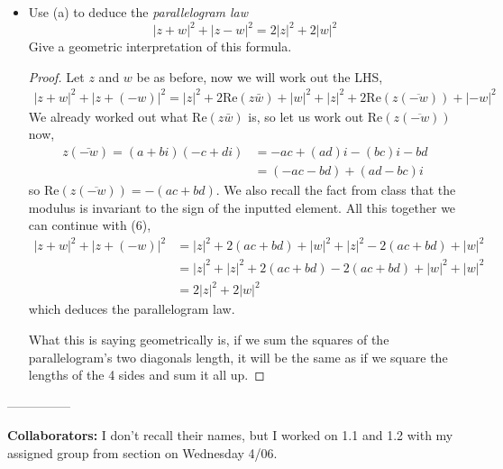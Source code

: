 \documentclass[11pt]{article}
\newenvironment{problem}[2][Problem\!]{\begin{trivlist}
\item[\hskip \labelsep {\bfseries #1}\hskip \labelsep {\bfseries #2.}]}{\end{trivlist}}
\newcommand{\abs}[1]{\left\lvert#1\right\rvert} %
\begin{document}
\begin{problem}{1.3}
\begin{itemize}[itemsep=3em]
\item[(b)] Use (a) to deduce the \emph{parallelogram law}
\[\abs{z+w}^2 + \abs{z-w}^2 = 2\abs{z}^2 + 2\abs{w}^2\]
Give a geometric interpretation of this formula. 
\begin{example}
    \begin{proof}
        Let $z$ and $w$ be as before, now we will work out the LHS,
        \begin{align}
            \abs{z + w}^{2} + \abs{z + (-w)}^{2} = \abs{z}^{2} + 2\text{Re}(z\bar{w}) + \abs{w}^{2} + \abs{z}^{2} + 2\text{Re}(z(\overline{-w})) + \abs{-w}^{2}
        \end{align}
        We already worked out what Re$(z\bar{w})$ is, so let us work out Re$(z(\overline{-w}))$ now,
        \begin{align*}
            z(\bar{-w}) = (a+bi)(-c+di) &= -ac + (ad)i -(bc)i -bd \\
            &= (-ac -bd) + (ad -bc)i
        \end{align*}
        so Re$(z(\overline{-w})) = -(ac+bd)$. We also recall the fact from class that the modulus is invariant to the sign of the inputted element. All this together we can continue with (6),
        \begin{align*}
            \abs{z + w}^{2} + \abs{z + (-w)}^{2} &= \abs{z}^{2} + 2(ac + bd) + \abs{w}^{2} + \abs{z}^{2} -2(ac +bd) + \abs{w}^{2} \\
            &=\abs{z}^{2} + \abs{z}^{2} +2(ac+bd) -2(ac + bd) + \abs{w}^{2} + \abs{w}^{2} \\
            &= 2\abs{z}^{2} + 2\abs{w}^{2}
        \end{align*}
        which deduces the parallelogram law. 

        What this is saying geometrically is, if we sum the squares of the parallelogram's two diagonals length, it will be the same as if we square the lengths of the 4 sides and sum it all up. 
    \end{proof}
\end{example}

\end{itemize}

\end{problem}

---------------
\newpage  %

\begin{center}
\textbf{Collaborators:}
 I don't recall their names, but I worked on 1.1 and 1.2 with my assigned group from section on Wednesday 4/06. 
\end{center}

\end{document}
